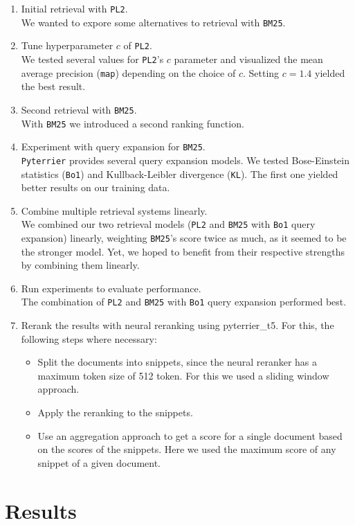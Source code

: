 \documentclass[DIN, pagenumber=false, fontsize=11pt, parskip=half]{scrartcl}
\begin{document}
\begin{enumerate}
\item Initial retrieval with \texttt{PL2}.\\
We wanted to expore some alternatives to retrieval with \texttt{BM25}.
\item Tune hyperparameter \(c\) of \texttt{PL2}.\\
We tested several values for \texttt{PL2}'s \(c\) parameter and visualized the mean average precision (\texttt{map}) depending on the choice of \(c\). Setting \(c=1.4\) yielded the best result.
\item Second retrieval with \texttt{BM25}.\\
With \texttt{BM25} we introduced a second ranking function.
\item Experiment with query expansion for \texttt{BM25}.\\
\texttt{Pyterrier} provides several query expansion models. We tested Bose-Einstein statistics (\texttt{Bo1}) and Kullback-Leibler divergence (\texttt{KL}). The first one yielded better results on our training data.
\item Combine multiple retrieval systems linearly.\\
We combined our two retrieval models (\texttt{PL2} and \texttt{BM25} with \texttt{Bo1} query expansion) linearly, weighting \texttt{BM25}'s score twice as much, as it seemed to be the stronger model. Yet, we hoped to benefit from their respective strengths by combining them linearly.
\item Run experiments to evaluate performance.\\
The combination of \texttt{PL2} and \texttt{BM25} with \texttt{Bo1} query expansion performed best.
\item Rerank the results with neural reranking using pyterrier\_t5\cite{githubRepo}. For this, the following steps where necessary:
\begin{itemize}
    \item Split the documents into snippets, since the neural reranker has a maximum token size of 512 token. For this we used a sliding window approach.
    \item Apply the reranking to the snippets.
    \item Use an aggregation approach to get a score for a single document based on the scores of the snippets. Here we used the maximum score of any snippet of a given document.
\end{itemize}
\end{enumerate}

\section*{Results}




\end{document}
